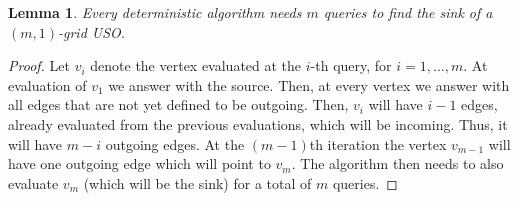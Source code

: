 \documentclass[a4paper,10pt]{article}
\newtheorem{lemma}{Lemma}
\begin{document}
\begin{lemma}\label{lem:kx1}
Every deterministic algorithm needs $m$ queries to find the sink of a $(m,1)$-grid USO. 
\end{lemma}
\begin{proof}
Let $v_i$ denote the vertex evaluated at the $i$-th query, for $i=1,\ldots, m$. At evaluation of $v_1$ we answer with the source. Then, at every vertex 
we answer with all edges that are not yet defined to be outgoing. Then, $v_i$ will have $i-1$ edges, already evaluated from the previous evaluations, which will 
be incoming. Thus, it will have $m-i$ outgoing edges. At the $(m-1)$th iteration the vertex $v_{m-1}$ will have one outgoing edge which will point to $v_m$.
The algorithm then needs to also evaluate $v_m$ (which will be the sink) for a total of $m$ queries. 
\end{proof}
\end{document}
